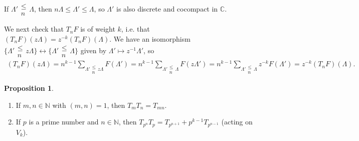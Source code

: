 \documentclass{article}
\theoremstyle{definition}
\newtheorem{prop}[theorem]{Proposition}
\begin{document}
If $\Lambda' \substack{\le  \\ n} \Lambda$, then $n \Lambda \le  \Lambda' \le \Lambda$, so $\Lambda'$ is also discrete and cocompact in $\mathbb{C}$.
\vspace{1mm}
 
We next check that $T_nF$ is of weight $k$, i.e. that $(T_nF)(z \Lambda) = z^{-k}(T_nF)(\Lambda)$. We have an isomorphism $\{\Lambda' \substack{\le \\ n} z\Lambda\} \leftrightarrow \{\Lambda' \substack{\le \\n} \Lambda\}$ given by $\Lambda' \mapsto z^{-1} \Lambda'$, so
\begin{align*}
    (T_nF)(z \Lambda) = n^{k-1}\sum_{\Lambda' \substack{\le \\ n} z\Lambda}^{} F(\Lambda') = n^{k-1} \sum_{\Lambda' \substack{\le  \\ n} \Lambda}^{} F(z \Lambda') = n^{k-1}\sum_{\Lambda' \substack{\le  \\ n} \Lambda} z^{-k}F(\Lambda') = z^{-k}(T_nF)(\Lambda).
\end{align*}
\begin{prop}
    \begin{enumerate}[(1)]
        \item If $m,n \in \mathbb{N}$ with $(m,n) = 1$, then $T_mT_n = T_{mn}$.
        \item If $p$ is a prime number and $n \in \mathbb{N}$, then $T_{p^n}T_p = T_{p^{n+1}}+p^{k-1}T_{p^{n-1}}$ (acting on $V_k$). 
    \end{enumerate}
\end{prop}
\end{document}
